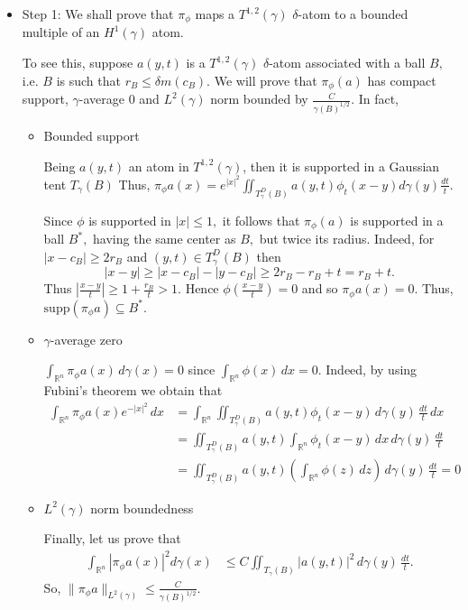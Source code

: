 \documentclass[leqno,11pt]{amsart}
\theoremstyle{plain}
\theoremstyle{remark}
\begin{document}
{{

\begin{itemize}
\item  Step 1: We shall prove that $\pi_\phi$ maps a $T^{1,2}(\gamma)$ $\delta$-atom to a bounded multiple of an $H^1(\gamma)$ atom. 

To see this, suppose $a(y,t)$ is a $T^{1,2}(\gamma)$ $\delta$-atom associated with a ball $B,$ i.e. 
$B$ is such that $r_B\le \delta m(c_B).$ We will prove that $\pi_\phi (a) $
has compact support, $\gamma$-average 0 and $L^2 (\gamma)$
norm bounded by $\frac{C}{\gamma(B)^{1/2}} $. In fact, 
\begin{itemize}
\item Bounded support

Being $a(y,t)$ an atom in $T^{1,2}(\gamma)$, then it is supported in a Gaussian tent 
$ 
T_\gamma(B)$ 
Thus, $\displaystyle \pi_\phi a (x)=e^{|x|^2}
\iint_{T^D_\gamma(B)} a(y,t) \phi_t(x-y)d\gamma(y)\frac{dt}{t}.$  

Since $\phi$ is supported in $|x|\le 1,$ it follows that $\pi_\phi (a)$ is supported in a ball $B^*,$ having the same center as $B,$ but twice its radius. Indeed, for $|x-c_B|\ge 2r_B$ and $(y,t)\in T_\gamma^D(B)$ then
$$|x-y|\ge |x-c_B|-|y-c_B|\ge 2r_B-r_B+t=r_B+t.$$ Thus $\left|\frac{x-y}{t}\right|\ge 1+\frac{r_B}{t}>1.$ Hence $\phi\left(\frac{x-y}{t}\right)=0$ and so $\pi_\phi a (x)=0.$ Thus, 
$\text{supp}(\pi_\phi a)\subseteq B^*.$


\item $\gamma$-average zero 

$\int_{{\mathbb R}^n}\pi_\phi a (x)\, d\gamma(x)=0$ since $\int_{{\mathbb R}^n} \phi (x)\, dx=0.$ Indeed, by using Fubini's theorem we obtain that
\begin{align*}
\int_{{\mathbb R}^n} \pi_\phi a (x)e^{-|x|^2}\, dx& = \int_{{\mathbb R}^n}\iint_{T^D_\gamma(B)} a(y,t)\phi_{t}(x-y)\, d\gamma(y)\, \frac{dt}{t}\, dx
\\ &= \iint_{T^D_\gamma(B)}a(y,t)\int_{{\mathbb R}^n}\phi_{t}(x-y)\, dx\, d\gamma(y)\, \frac{dt}{t}\\ &=\iint_{T^D_\gamma(B)}a(y,t)\left(\int_{{\mathbb R}^n}\phi(z)\, dz\right)\, d\gamma(y)\, \frac{dt}{t}=0
\end{align*}

\item $L^2(\gamma)$ norm boundedness

Finally, let us prove that 
\begin{align*}
\int_{{\mathbb R}^n} |\pi_\phi a (x)|^2 d\gamma (x)&\le C \iint_{T_\gamma(B)}|a(y,t)|^2 \, d\gamma(y)\, \frac{dt}{t}.
\end{align*}
So, $\|\pi_\phi a\|_{L^2(\gamma)}\le \frac{C}{\gamma(B)^{1/2}}.$


\end{itemize}
\end{itemize}}}
\end{document}
